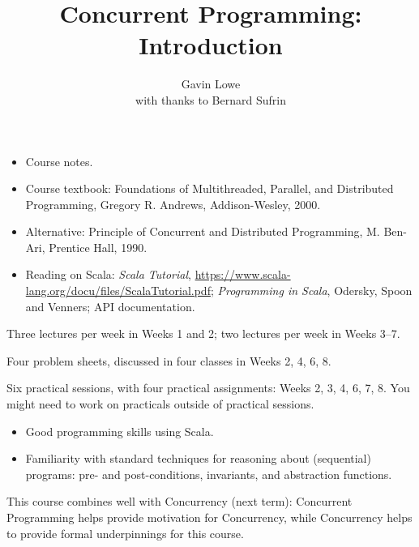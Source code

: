 \documentclass[notes,color]{sepslide0}
\title{Concurrent Programming: Introduction}
\author{Gavin Lowe \\ with thanks to Bernard Sufrin}
\begin{document}
\begin{slide}
  
  \Title

\end{slide}

\begin{slide}

\begin{itemize}
\item Course notes.

\item Course textbook: Foundations of Multithreaded, Parallel, and Distributed
Programming, Gregory R. Andrews, Addison-Wesley, 2000.

\item
Alternative: Principle of Concurrent and Distributed Programming, M. Ben-Ari,
Prentice Hall, 1990.

\item Reading on Scala: \emph{Scala Tutorial},
  \url{https://www.scala-lang.org/docu/files/ScalaTutorial.pdf}; 
  \emph{Programming in Scala}, Odersky, Spoon and Venners; API documentation.
\end{itemize}
\end{slide}


\begin{slide}

Three lectures per week in Weeks 1 and 2; two lectures per week in Weeks 3--7.


Four problem sheets, discussed in four classes in Weeks 2, 4, 6, 8.

Six practical sessions, with four practical assignments: Weeks 2,
3, 4, 6, 7, 8.  You might need to work on practicals outside of practical
sessions.
\end{slide}


\begin{slide}

\begin{itemize}
\item Good programming skills using Scala. 


\item Familiarity with standard techniques for reasoning about (sequential)
programs:  pre- and post-conditions, invariants, and abstraction functions.
\end{itemize}

This course combines well with Concurrency (next term): Concurrent Programming
helps provide motivation for Concurrency, while Concurrency helps to provide
formal underpinnings for this course.
\end{slide}
\end{document}
